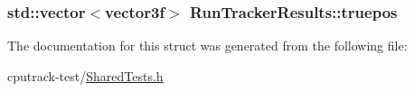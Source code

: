 \subsubsection[{\texorpdfstring{truepos}{truepos}}]{\setlength{\rightskip}{0pt plus 5cm}std\+::vector$<${\bf vector3f}$>$ Run\+Tracker\+Results\+::truepos}\hypertarget{struct_run_tracker_results_a3dea14e81b2d19737fbb8037e5416dfd}{}\label{struct_run_tracker_results_a3dea14e81b2d19737fbb8037e5416dfd}


The documentation for this struct was generated from the following file\+:\begin{DoxyCompactItemize}
\item 
cputrack-\/test/\hyperlink{_shared_tests_8h}{Shared\+Tests.\+h}\end{DoxyCompactItemize}
